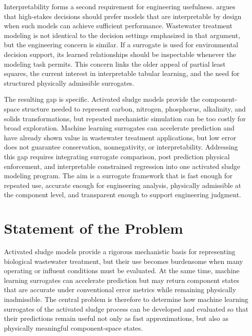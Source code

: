 \documentclass[12pt, twoside]{book}
\begin{document}
Interpretability forms a second requirement for engineering usefulness. \citet{Rudin2019} argues that
high-stakes decisions should prefer models that are interpretable by design when such models can achieve
sufficient performance. Wastewater treatment modeling is not identical to the decision settings emphasized in
that argument, but the engineering concern is similar. If a surrogate is used for environmental decision
support, its learned relationships should be inspectable whenever the modeling task permits. This concern links
the older appeal of partial least squares, the current interest in interpretable tabular learning, and the need
for structured physically admissible surrogates.

The resulting gap is specific. Activated sludge models provide the component-space structure needed to
represent carbon, nitrogen, phosphorus, alkalinity, and solids transformations, but repeated mechanistic
simulation can be too costly for broad exploration. Machine learning surrogates can accelerate prediction and
have already shown value in wastewater treatment applications, but low error does not guarantee conservation,
nonnegativity, or interpretability. Addressing this gap requires integrating surrogate comparison, post
prediction physical enforcement, and interpretable constrained regression into one activated sludge modeling
program. The aim is a surrogate framework that is fast enough for repeated use, accurate enough for
engineering analysis, physically admissible at the component level, and transparent enough to support
engineering judgment.

\section{Statement of the Problem}

Activated sludge models provide a rigorous mechanistic basis for representing biological wastewater treatment,
but their use becomes burdensome when many operating or influent conditions must be evaluated. At the same
time, machine learning surrogates can accelerate prediction but may return component states that are accurate
under conventional error metrics while remaining physically inadmissible. The central problem is therefore to
determine how machine learning surrogates of the activated sludge process can be developed and evaluated so
that their predictions remain useful not only as fast approximations, but also as physically meaningful
component-space states.
\end{document}
